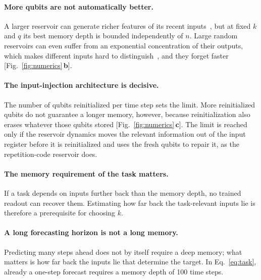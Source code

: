 \documentclass[aps,pra,reprint,superscriptaddress,floatfix]{revtex4-2}
\theoremstyle{plain}
\newcommand{\pnl}[1]{\textsf{\textbf{#1}}}
\begin{document}
\paragraph*{More qubits are not automatically better.}
A larger reservoir can generate richer features of its recent inputs~\cite{Nakajima2019}, but at fixed $k$ and $q$ its best memory depth is bounded independently of $n$. Large random reservoirs can even suffer from an exponential concentration of their outputs, which makes different inputs hard to distinguish~\cite{Xiong2025,Dao2026}, and they forget faster [Fig.~\ref{fig:numerics}\,\pnl{b}].

\paragraph*{The input-injection architecture is decisive.}
The number of qubits reinitialized per time step sets the limit. More reinitialized qubits do not guarantee a longer memory, however, because reinitialization also erases whatever those qubits stored [Fig.~\ref{fig:numerics}\,\pnl{c}]. The limit is reached only if the reservoir dynamics moves the relevant information out of the input register before it is reinitialized and uses the fresh qubits to repair it, as the repetition-code reservoir does.

\paragraph*{The memory requirement of the task matters.}
If a task depends on inputs further back than the memory depth, no trained readout can recover them. Estimating how far back the task-relevant inputs lie is therefore a prerequisite for choosing $k$.

\paragraph*{A long forecasting horizon is not a long memory.}
Predicting many steps ahead does not by itself require a deep memory; what matters is how far back the inputs lie that determine the target. In Eq.~\eqref{eq:task}, already a one-step forecast requires a memory depth of 100 time steps.
\end{document}
